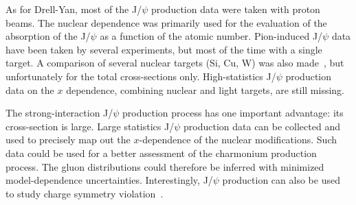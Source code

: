 As for Drell-Yan, most of the J/$\psi$ production data were taken with proton beams. The nuclear dependence  was primarily used for the evaluation of the absorption of the J/$\psi$ as a function of the atomic number.  Pion-induced J/$\psi$ data have been taken by several experiments, but most of the time with a single target.  A comparison of several nuclear targets (Si, Cu, W) was also made~\cite{Alexandrov:1999ch},   but unfortunately for the total cross-sections only. High-statistics J/$\psi$ production data on the $x$ dependence, combining nuclear and light targets, are still missing. 

The strong-interaction J/$\psi$ production process has one important advantage: its cross-section is large.  Large statistics J/$\psi$ production data can be collected and  used to precisely map out the $x$-dependence of the nuclear modifications. Such data could be  used for a better assessment of the charmonium production process.  The gluon distributions could  therefore be inferred with minimized model-dependence uncertainties. Interestingly, J/$\psi$ production can also be used to study charge symmetry violation~\cite{Piller:1995nc}. 